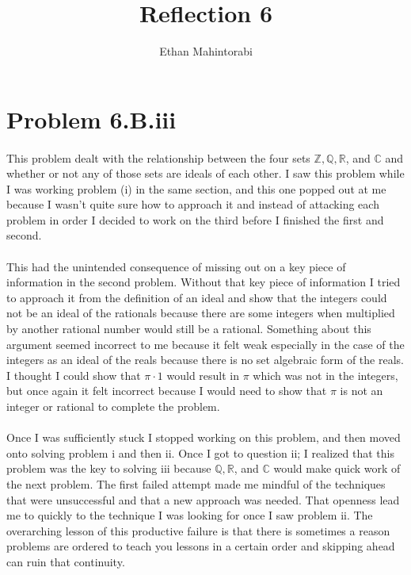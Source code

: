 \documentclass{article}
\begin{document}
  
  \title{Reflection 6}
  \author{Ethan Mahintorabi}
  
  \maketitle

  
  \section*{Problem 6.B.iii}
    \paragraph{} This problem dealt with the relationship between the four sets $\mathbb{Z}, \mathbb{Q}, \mathbb{R}$, and $\mathbb{C}$ and whether or not any of those sets are ideals of each other. I saw this problem while I was working problem (i) in the same section, and this one popped out at me because I wasn't quite sure how to approach it and instead of attacking each problem in order I decided to work on the third before I finished the first and second.

    \paragraph{} This had the unintended consequence of missing out on a key piece of information in the second problem. Without that key piece of information I tried to approach it from the definition of an ideal and show that the integers could not be an ideal of the rationals because there are some integers when multiplied by another rational number would still be a rational. Something about this argument seemed incorrect to me because it felt weak especially in the case of the integers as an ideal of the reals because there is no set algebraic form of the reals. I thought I could show that $\pi \cdot 1$ would result in $\pi$ which was not in the integers, but once again it felt incorrect because I would need to show that $\pi$ is not an integer or rational to complete the problem.
    
    \paragraph{} Once I was sufficiently stuck I stopped working on this problem, and then moved onto solving problem i and then ii. Once I got to question ii; I realized that this problem was the key to solving iii because $\mathbb{Q}, \mathbb{R}$, and $\mathbb{C}$ would make quick work of the next problem. The first failed attempt made me mindful of the techniques that were unsuccessful and that a new approach was needed. That openness lead me to quickly to the technique I was looking for once I saw problem ii. The overarching lesson of this productive failure is that there is sometimes a reason problems are ordered to teach you lessons in a certain order and skipping ahead can ruin that continuity.
\end{document}
